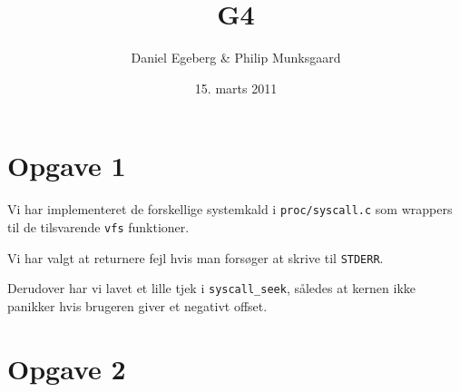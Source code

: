 \documentclass [10pt,a4paper]{article}
\title{G4}
\author{Daniel Egeberg \& Philip Munksgaard}
\date{15. marts 2011}
\begin{document}
\maketitle

\section*{Opgave 1} %

Vi har implementeret de forskellige systemkald i \verb+proc/syscall.c+
som wrappers til de tilsvarende \verb+vfs+ funktioner.

Vi har valgt at returnere fejl hvis man forsøger at skrive til
\verb+STDERR+.

Derudover har vi lavet et lille tjek i \verb+syscall_seek+, således at
kernen ikke panikker hvis brugeren giver et negativt offset.


\section*{Opgave 2} %

\end{document}
